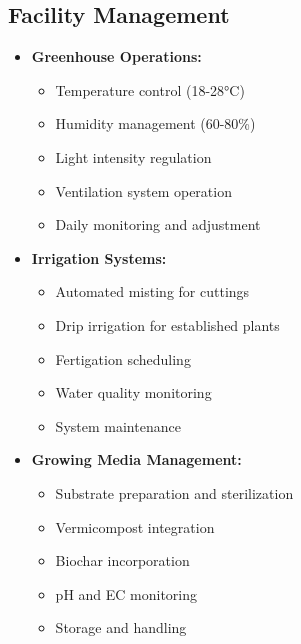 \subsection{Facility Management}
\begin{itemize}
    \item \textbf{Greenhouse Operations:}
    \begin{itemize}
        \item Temperature control (18-28°C)
        \item Humidity management (60-80\%)
        \item Light intensity regulation
        \item Ventilation system operation
        \item Daily monitoring and adjustment
    \end{itemize}
    
    \item \textbf{Irrigation Systems:}
    \begin{itemize}
        \item Automated misting for cuttings
        \item Drip irrigation for established plants
        \item Fertigation scheduling
        \item Water quality monitoring
        \item System maintenance
    \end{itemize}
    
    \item \textbf{Growing Media Management:}
    \begin{itemize}
        \item Substrate preparation and sterilization
        \item Vermicompost integration
        \item Biochar incorporation
        \item pH and EC monitoring
        \item Storage and handling
    \end{itemize}
\end{itemize}

